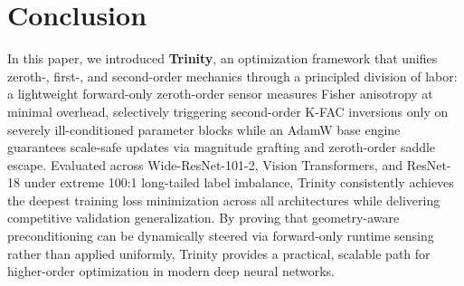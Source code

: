 \documentclass[conference]{IEEEtran}
\begin{document}
\section{Conclusion}
\label{sec:conclusion}

In this paper, we introduced \textbf{Trinity}, an optimization framework that unifies zeroth-, first-, and second-order mechanics through a principled division of labor: a lightweight forward-only zeroth-order sensor measures Fisher anisotropy at minimal overhead, selectively triggering second-order K-FAC inversions only on severely ill-conditioned parameter blocks while an AdamW base engine guarantees scale-safe updates via magnitude grafting and zeroth-order saddle escape. Evaluated across Wide-ResNet-101-2, Vision Transformers, and ResNet-18 under extreme 100:1 long-tailed label imbalance, Trinity consistently achieves the deepest training loss minimization across all architectures while delivering competitive validation generalization. By proving that geometry-aware preconditioning can be dynamically steered via forward-only runtime sensing rather than applied uniformly, Trinity provides a practical, scalable path for higher-order optimization in modern deep neural networks.
\end{document}
